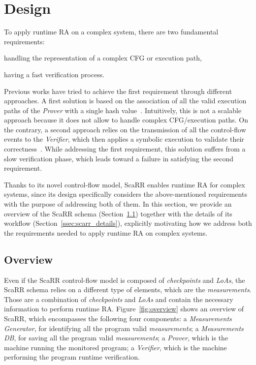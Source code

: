 \section{Design}
\label{sec:proposal}

To apply runtime RA on a complex system, there are two fundamental 
requirements: 
\begin{enumerate*}[label=(\roman*)]
	\item handling the representation of a complex CFG or execution path,
	\item having a fast verification process.
\end{enumerate*}
Previous works have tried to achieve the first requirement through different 
approaches. A first solution is based on the association of all the valid 
execution paths of the \emph{Prover} with a single hash 
value~\citep{abera2016c,zeitouni2017atrium,dessouky2017fat}. 
Intuitively, this is not a scalable approach because it does not allow to 
handle complex CFG/execution paths. 
On the contrary, a second approach relies on the transmission of all the 
control-flow events to the \emph{Verifier}, which then applies a symbolic 
execution to validate their 
correctness~\citep{Dessouky:2018:LLH:3240765.3240821}. 
While addressing the first requirement, this solution suffers from a slow 
verification phase, which leads toward a failure in satisfying the second 
requirement. 

Thanks to its novel control-flow model, ScaRR enables runtime RA for complex 
systems, since its design specifically considers the above-mentioned 
requirements with the purpose of addressing both of them. In this section, we 
provide an overview of the ScaRR schema (Section~\ref{ssec:scarr_overview}) 
together with the details of its workflow (Section~\ref{ssec:scarr_details}), 
explicitly motivating how we address both the requirements needed to apply 
runtime RA on complex systems. 

\subsection{Overview}
\label{ssec:scarr_overview}
Even if the ScaRR control-flow model is composed of \emph{checkpoints} and 
\emph{LoAs}, the ScaRR schema relies on a different type of elements, which are 
the \emph{measurements}. Those are a combination of \emph{checkpoints} and 
\emph{LoAs} and contain the necessary information to perform runtime RA. 
Figure~\ref{fig:overview} shows an overview of ScaRR, which encompasses the 
following four components: a \emph{Measurements Generator}, for identifying all 
the program valid \emph{measurements}; 
a \emph{Measurements DB}, for saving all the program valid \emph{measurements};
a \emph{Prover}, which is the machine running the monitored program;
a \emph{Verifier}, which is the machine performing the program runtime 
verification. 

